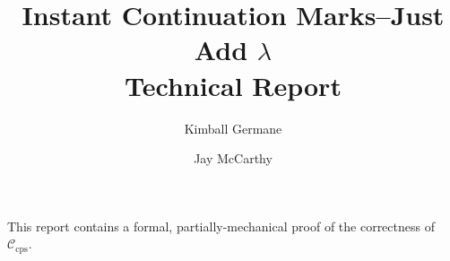 \documentclass{llncs}
\title{Instant Continuation Marks--Just Add $\lambda$\\
Technical Report}
\author{Kimball Germane \and Jay McCarthy}
\institute{Brigham Young University, Provo, Utah}
\begin{document}
\maketitle

This report contains a formal, partially-mechanical proof of the correctness of $\mathcal{C}_{\mathrm{cps}}$.



\end{document}
